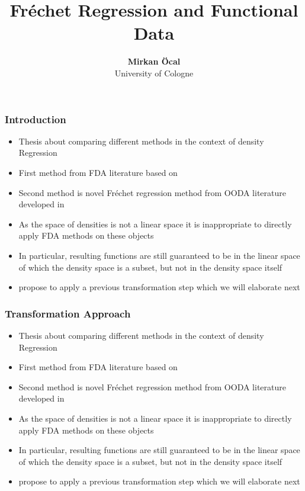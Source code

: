 \documentclass[11pt, aspectratio=169]{beamer}
\begin{document}
\title{Fréchet Regression and Functional Data}

\author[Mirkan Öcal]
{
{\bf Mirkan Öcal}\\
{\small University of Cologne}\\[1ex]
}


\begin{frame}
    \titlepage
    \note{~}
\end{frame}


\begin{frame}[allowframebreaks]
    \frametitle{Introduction}
    \begin{itemize}
        \item Thesis about comparing different methods in the context of density Regression
        \item First method from FDA literature based on \textcite{PetersenMüller2016}
        \item Second method is novel Fréchet regression method from OODA literature developed in \textcite{PetersenMüller2019}
    \end{itemize}
    \framebreak
    \begin{itemize}
        \item As the space of densities is not a linear space it is inappropriate to directly apply FDA methods on these objects
        \item In particular, resulting functions are still guaranteed to be in the linear space of which the density space is a subset,
        but not in the density space itself
        \item \textcite{PetersenMüller2016} propose to apply a previous transformation step which we will elaborate next
    \end{itemize}
\end{frame}

\begin{frame}[allowframebreaks]
    \frametitle{Transformation Approach}
    \begin{itemize}
        \item Thesis about comparing different methods in the context of density Regression
        \item First method from FDA literature based on \textcite{PetersenMüller2016}
        \item Second method is novel Fréchet regression method from OODA literature developed in \textcite{PetersenMüller2019}
    \end{itemize}
    \framebreak
    \begin{itemize}
        \item As the space of densities is not a linear space it is inappropriate to directly apply FDA methods on these objects
        \item In particular, resulting functions are still guaranteed to be in the linear space of which the density space is a subset,
        but not in the density space itself
        \item \textcite{PetersenMüller2016} propose to apply a previous transformation step which we will elaborate next
    \end{itemize}
\end{frame}
\end{document}
